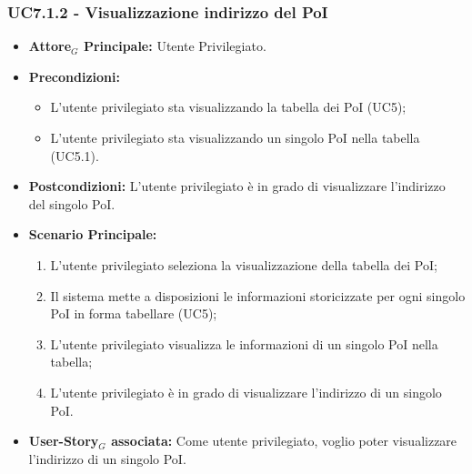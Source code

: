 \documentclass[11pt]{article}
\begin{document}
\begin{justify}
\subsubsection{\textbf{UC7.1.2 - Visualizzazione indirizzo del PoI}}
\label{UC7.1.2}
\begin{itemize}
    \item \textbf{Attore$_G$ Principale:} Utente Privilegiato.
    \item \textbf{Precondizioni:} 
        \begin{itemize}
          \item L'utente privilegiato sta visualizzando la tabella dei PoI (UC5);
            \item L'utente privilegiato sta visualizzando un singolo PoI nella tabella (UC5.1).
        \end{itemize}
      \item \textbf{Postcondizioni:} L'utente privilegiato è in grado di visualizzare l'indirizzo del singolo PoI.
    \item \textbf{Scenario Principale:} 
        \begin{enumerate}
        \item L'utente privilegiato seleziona la visualizzazione della tabella dei PoI;
          \item Il sistema mette a disposizioni le informazioni storicizzate per ogni singolo PoI in forma tabellare (UC5);
          \item L'utente privilegiato visualizza le informazioni di un singolo PoI nella tabella;
            \item L'utente privilegiato è in grado di visualizzare l'indirizzo di un singolo PoI.
        \end{enumerate}
    \item \textbf{User-Story$_G$ associata:} Come utente privilegiato, voglio poter visualizzare l'indirizzo di un singolo PoI.
\end{itemize}

\end{justify}
\end{document}
